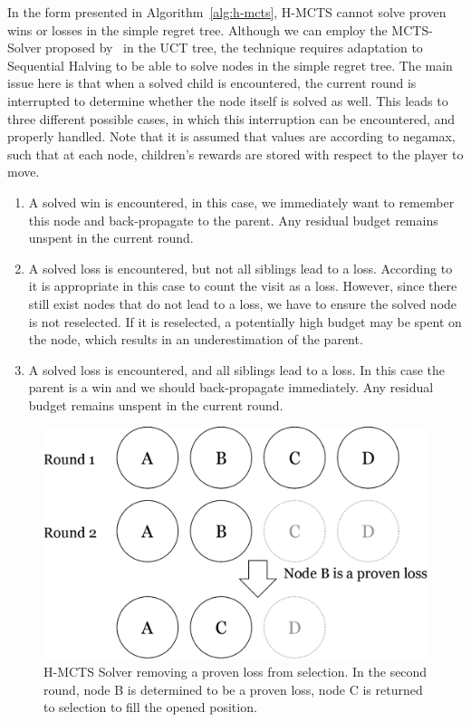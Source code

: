 \documentclass{kecsmstr}
\begin{document}
In the form presented in Algorithm~\ref{alg:h-mcts}, H-MCTS cannot solve proven wins or losses in the simple regret tree. Although we can employ the MCTS-Solver proposed by~ in the UCT tree, the technique requires adaptation to Sequential Halving to be able to solve nodes in the simple regret tree. The main issue here is that when a solved child is encountered, the current round is interrupted to determine whether the node itself is solved as well. This leads to three different possible cases, in which this interruption can be encountered, and properly handled. Note that it is assumed that values are according to negamax, such that at each node, children's rewards are stored with respect to the player to move.
\begin{enumerate}
\item A solved win is encountered, in this case, we immediately want to remember this node and back-propagate to the parent. Any residual budget remains unspent in the current round.
\item A solved loss is encountered, but not all siblings lead to a loss. According to~ it is appropriate in this case to count the visit as a loss. However, since there still exist nodes that do not lead to a loss, we have to ensure the solved node is not reselected. If it is reselected, a potentially high budget may be spent on the node, which results in an underestimation of the parent.
\item A solved loss is encountered, and all siblings lead to a loss. In this case the parent is a win and we should back-propagate immediately. Any residual budget remains unspent in the current round.
\end{enumerate}
\begin{figure}[hb]
	\centering
	\includegraphics[width=.6\textwidth]{img/solver.png}
	\caption[H-MCTS Solver example]{H-MCTS Solver removing a proven loss from selection. In the second round, node B is determined to be a proven loss, node C is returned to selection to fill the opened position.}
	\label{fig:h-mcts_solver}
\end{figure}
\end{document}
